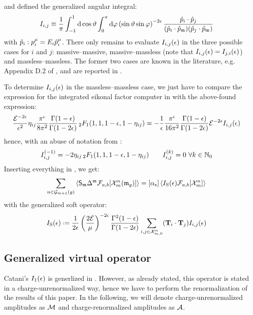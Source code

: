 and defined the generalized angular integral:
\begin{equation}
  I_{i,j} \equiv \frac{1}{\pi} \int_{-1}^1 \mathrm{d} \cos \vartheta \int_0^\pi \mathrm{d} \varphi \left( \sin \vartheta \sin \varphi \right)^{-2\epsilon} \frac{\hat{p}_i \cdot \hat{p}_j}{(\hat{p}_i \cdot \hat{p}_{\mathfrak{m}}) (\hat{p}_j \cdot \hat{p}_{\mathfrak{m}})}
  \label{eq:gen-int}
\end{equation}
with $ \hat{p}_i : p_i^\mu = E_i \hat{p}_i^\mu $. There only remains to evaluate $ I_{i,j}(\epsilon) $ in the three possible cases for $ i $ and $ j $: massive--massive, massive--massless (note that $ I_{i,j}(\epsilon) = I_{j,i}(\epsilon) $) and massless--massless. The former two cases are known in the literature, e.g. Appendix D.2 of \cite{Behring-2020}, and are reported in .

To determine $ I_{i,j}(\epsilon) $ in the massless--massless case, we just have to compare the expression for the integrated eikonal factor computer in  with the above-found expression:
\begin{equation*}
  \frac{\mathcal{E}^{-2\epsilon}}{\epsilon^2} \eta_{ij} \frac{\pi^\epsilon}{8\pi^2} \frac{\Gamma(1-\epsilon)}{\Gamma(1-2\epsilon)} \,{_2F_1}(1,1,1-\epsilon,1-\eta_{ij}) = - \frac{1}{\epsilon} \frac{\pi^\epsilon}{16\pi^2} \frac{\Gamma(1-\epsilon)}{\Gamma(1-2\epsilon)} \mathcal{E}^{-2\epsilon} I_{i,j}(\epsilon)
\end{equation*}
hence, with an abuse of notation from :
\begin{equation}
  I_{i,j}^{(-1)} = - 2 \eta_{ij} \,{_2F_1}(1,1,1-\epsilon,1-\eta_{ij})
  \qquad
  I_{i,j}^{(k)} = 0 \,\,\forall k \in \mathbb{N}_0
  \label{eq:i-nmnm}
\end{equation}
Inserting everything in , we get:
\begin{equation}
  \sum_{n \in \mathcal{G}_{m+1}(g)} \left\langle \mathsf{S}_{\mathfrak{m}} \Delta^{\mathfrak{m}} \mathcal{F}_{a,b}[\mathcal{X}^{n}_{m}(\mathfrak{m}_g)] \right\rangle = [\alpha_\text{s}] \left\langle I_\text{S}(\epsilon) \mathcal{F}_{a,b}[\mathcal{X}^{n}_{m}] \right\rangle
\end{equation}
with the generalized soft operator:
\begin{equation}
  \iso(\de) \defeq \frac{1}{2\de} \left( \frac{2\ema}{\mu} \right)^{-2\de} \frac{\Gamma^2(1-\de)}{\Gamma(1-2\de)} \sum_{i,j \in \fsp{n}{m}} (\cc) \eit_{i,j}(\de)
\end{equation}

\subsection{Generalized virtual operator}

Catani's $ I_1(\epsilon) $ is generlized in \cite{Catani-2001}. However, as already stated, this operator is stated in a charge-unrenormalized way, hence we have to perform the renormalization of the results of this paper. In the following, we will denote charge-unrenormalized amplitudes as $ \mathcal{M} $ and charge-renormalized amplitudes as $ \mathcal{A} $.

